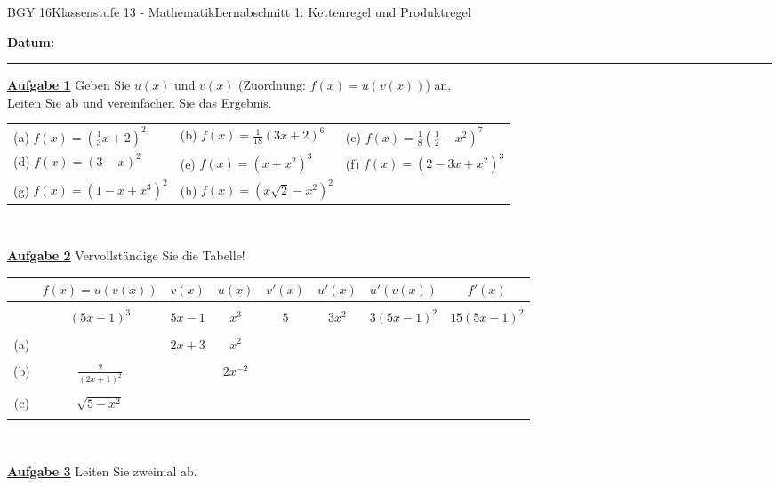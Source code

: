 \documentclass[oneside,openany,headings=optiontotoc,11pt,numbers=noenddot]{scrreprt}
\begin{document}
	\begin{worksheet}{BGY 16}{Klassenstufe 13 - Mathematik}{Lernabschnitt 1: Kettenregel und Produktregel}
				
		\noindent
		\sffamily
		\textbf{Datum:}
		\rule{0.91\textwidth}{0.4pt}
		\begin{framed}
			\noindent
			\textbf{\underline{Aufgabe 1}} Geben Sie \(u(x)\) und \(v(x)\) (Zuordnung: \(f(x) = u(v(x))\)) an.\\
			Leiten Sie ab und vereinfachen Sie das Ergebnis.\\
			\par
			\begin{tabularx}{\textwidth}{lll}
				(a) \(f(x)=(\frac{1}{3}x+2)^2\) & (b) \(f(x) = \frac{1}{18}(3x+2)^6\) & (c) \(f(x) = \frac{1}{8}(\frac{1}{2} -x^2)^7\)\\
				(d) \(f(x) = (3-x)^2\) & (e) \(f(x) = (x+x^2)^3\) & (f) \(f(x) = (2-3x+x^2)^3\)\\
				(g) \(f(x) = (1-x+x^3)^2\) & (h) \(f(x) = (x\sqrt{2}-x^2)^2\)
			\end{tabularx}\\
			\par\noindent
			\textbf{\underline{Aufgabe 2}} Vervollständige Sie die Tabelle!\\
			\par\noindent
			\begin{tabularx}{\textwidth}{c|c|c|c|c|c|c|c}
				& \(f(x) = u(v(x))\) & \(v(x)\) & \(u(x)\) & \(v'(x)\) & \(u'(x)\) & \(u'(v(x))\) & \(f'(x)\)\\
				\hline
				\\
				& \((5x-1)^3\) & \(5x-1\) & \(x^3\) & \(5\) & \(3x^2\) & \(3(5x-1)^2\) & \(15(5x-1)^2\)\\
				\hline
				\\
				(a) & & \(2x+3\) & \(x^2\) & & & &\\
				\hline
				\\
				(b) & \( \frac{2}{(2x+1)^2}\) & & \(2x^{-2}\) & & & &\\
				\hline
				\\
				(c) & \(\sqrt{5-x^2}\) & & & & & &\\
				\hline
				\\
			\end{tabularx}\\
			\par\noindent
			\textbf{\underline{Aufgabe 3}} Leiten Sie zweimal ab.\\
			\par
			\begin{tabularx}{\textwidth}{lll}

\end{tabularx}
\end{framed}
\end{worksheet}
\end{document}
